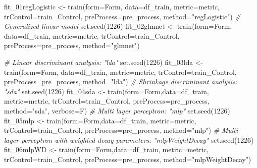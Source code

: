 \documentclass[
]{article}
\newenvironment{Shaded}{\begin{snugshade}}{\end{snugshade}}
\newcommand{\AttributeTok}[1]{\textcolor[rgb]{0.77,0.63,0.00}{#1}}
\newcommand{\CommentTok}[1]{\textcolor[rgb]{0.56,0.35,0.01}{\textit{#1}}}
\newcommand{\DecValTok}[1]{\textcolor[rgb]{0.00,0.00,0.81}{#1}}
\newcommand{\FunctionTok}[1]{\textcolor[rgb]{0.00,0.00,0.00}{#1}}
\newcommand{\NormalTok}[1]{#1}
\newcommand{\OtherTok}[1]{\textcolor[rgb]{0.56,0.35,0.01}{#1}}
\newcommand{\StringTok}[1]{\textcolor[rgb]{0.31,0.60,0.02}{#1}}
\begin{document}
\begin{Shaded}
\begin{Highlighting}[]
\NormalTok{fit\_01regLogistic }\OtherTok{\textless{}{-}} \FunctionTok{train}\NormalTok{(}\AttributeTok{form=}\NormalTok{Form, }\AttributeTok{data=}\NormalTok{df\_train, }\AttributeTok{metric=}\NormalTok{metric,}
                           \AttributeTok{trControl=}\NormalTok{train\_Control, }\AttributeTok{preProcess=}\NormalTok{pre\_process,}
                           \AttributeTok{method=}\StringTok{"regLogistic"}\NormalTok{)}
\CommentTok{\# Generalized linear model}
\FunctionTok{set.seed}\NormalTok{(}\DecValTok{1226}\NormalTok{)}
\NormalTok{fit\_02glmnet }\OtherTok{\textless{}{-}} \FunctionTok{train}\NormalTok{(}\AttributeTok{form=}\NormalTok{Form, }\AttributeTok{data=}\NormalTok{df\_train, }\AttributeTok{metric=}\NormalTok{metric,}
                      \AttributeTok{trControl=}\NormalTok{train\_Control, }\AttributeTok{preProcess=}\NormalTok{pre\_process,}
                      \AttributeTok{method=}\StringTok{"glmnet"}\NormalTok{)}

\CommentTok{\# Linear discriminant analysis: "lda"}
\FunctionTok{set.seed}\NormalTok{(}\DecValTok{1226}\NormalTok{)}
\NormalTok{fit\_03lda }\OtherTok{\textless{}{-}} \FunctionTok{train}\NormalTok{(}\AttributeTok{form=}\NormalTok{Form, }\AttributeTok{data=}\NormalTok{df\_train, }\AttributeTok{metric=}\NormalTok{metric,}
                   \AttributeTok{trControl=}\NormalTok{train\_Control, }\AttributeTok{preProcess=}\NormalTok{pre\_process,}
                   \AttributeTok{method=}\StringTok{"lda"}\NormalTok{)}
\CommentTok{\# Shrinkage discriminant analysis: "sda"}
\FunctionTok{set.seed}\NormalTok{(}\DecValTok{1226}\NormalTok{)}
\NormalTok{fit\_04sda }\OtherTok{\textless{}{-}} \FunctionTok{train}\NormalTok{(}\AttributeTok{form=}\NormalTok{Form,}\AttributeTok{data=}\NormalTok{df\_train, }\AttributeTok{metric=}\NormalTok{metric,}
                   \AttributeTok{trControl=}\NormalTok{train\_Control, }\AttributeTok{preProcess=}\NormalTok{pre\_process,}
                   \AttributeTok{method=}\StringTok{"sda"}\NormalTok{, }\AttributeTok{verbose=}\NormalTok{F)}
\CommentTok{\# Multi layer perceptron: "mlp"}
\FunctionTok{set.seed}\NormalTok{(}\DecValTok{1226}\NormalTok{)}
\NormalTok{fit\_05mlp }\OtherTok{\textless{}{-}} \FunctionTok{train}\NormalTok{(}\AttributeTok{form=}\NormalTok{Form,}\AttributeTok{data=}\NormalTok{df\_train, }\AttributeTok{metric=}\NormalTok{metric,}
                   \AttributeTok{trControl=}\NormalTok{train\_Control, }\AttributeTok{preProcess=}\NormalTok{pre\_process,}
                   \AttributeTok{method=}\StringTok{"mlp"}\NormalTok{)}
\CommentTok{\# Multi layer perceptron with weighted decay parameters: "mlpWeightDecay"}
\FunctionTok{set.seed}\NormalTok{(}\DecValTok{1226}\NormalTok{)}
\NormalTok{fit\_06mlpWD }\OtherTok{\textless{}{-}} \FunctionTok{train}\NormalTok{(}\AttributeTok{form=}\NormalTok{Form,}\AttributeTok{data=}\NormalTok{df\_train, }\AttributeTok{metric=}\NormalTok{metric,}
                     \AttributeTok{trControl=}\NormalTok{train\_Control, }\AttributeTok{preProcess=}\NormalTok{pre\_process,}
                     \AttributeTok{method=}\StringTok{"mlpWeightDecay"}\NormalTok{)}


\end{Highlighting}
\end{Shaded}
\end{document}
